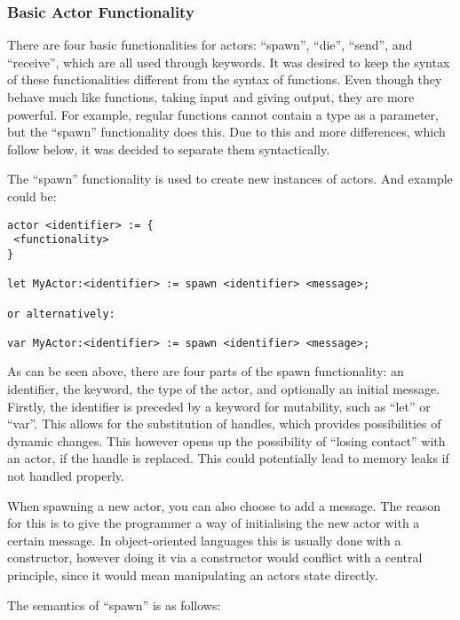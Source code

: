 \subsubsection{Basic Actor Functionality}
\label{subsubsec:BasicActorFunctionality}
There are four basic functionalities for actors: \enquote{spawn}, \enquote{die}, \enquote{send}, and \enquote{receive}, which are all used through keywords. It was desired to keep the syntax of these functionalities different from the syntax of functions. Even though they behave much like functions, taking input and giving output, they are more powerful. For example, regular functions cannot contain a type as a parameter, but the \enquote{spawn} functionality does this. Due to this and more differences, which follow below, it was decided to separate them syntactically.

The \enquote{spawn} functionality is used to create new instances of actors. And example could be:

\label{actorfuncSpawn}
\begin{lstlisting}
actor <identifier> := {
 <functionality>
}

let MyActor:<identifier> := spawn <identifier> <message>;

or alternatively:

var MyActor:<identifier> := spawn <identifier> <message>;
\end{lstlisting}

As can be seen above, there are four parts of the spawn functionality: an identifier, the keyword, the type of the actor, and optionally an initial message. Firstly, the identifier is preceded by a keyword for mutability, such as \enquote{let} or \enquote{var}. This allows for the substitution of handles, which provides possibilities of dynamic changes. This however opens up the possibility of \enquote{losing contact} with an actor, if the handle is replaced. This could potentially lead to memory leaks if not handled properly. 

When spawning a new actor, you can also choose to add a message. The reason for this is to give the programmer a way of initialising the new actor with a certain message. In object-oriented languages this is usually done with a constructor, however doing it via a constructor would conflict with a central principle, since it would mean manipulating an actors state directly.

The semantics of \enquote{spawn} is as follows:

